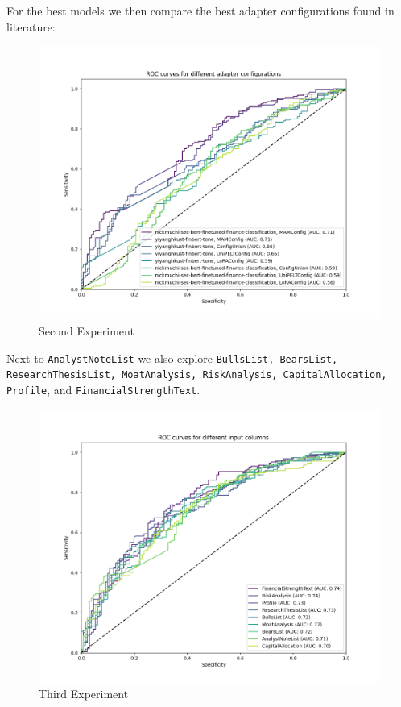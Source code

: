 \documentclass[conference]{IEEEtran}
\begin{document}
For the best models we then compare the best adapter configurations found in literature:

\begin{figure}[h!]
    \centering
    \includegraphics[width=.85\linewidth]{../3. evaluation/roc_curves/Second Experiment.png}
    \caption[Second Experiment]{Second Experiment}
    \label{fig:Secondexp}
\end{figure}

Next to \texttt{AnalystNoteList} we also explore \texttt{BullsList, BearsList, ResearchThesisList, MoatAnalysis, RiskAnalysis, CapitalAllocation, Profile}, and  \texttt{FinancialStrengthText}.

\begin{figure}[h!]
    \centering
    \includegraphics[width=.85\linewidth]{../3. evaluation/roc_curves/Third Experiment.png}
    \caption[Third Experiment]{Third Experiment}
    \label{fig:Thirdexp}
\end{figure}
\end{document}
